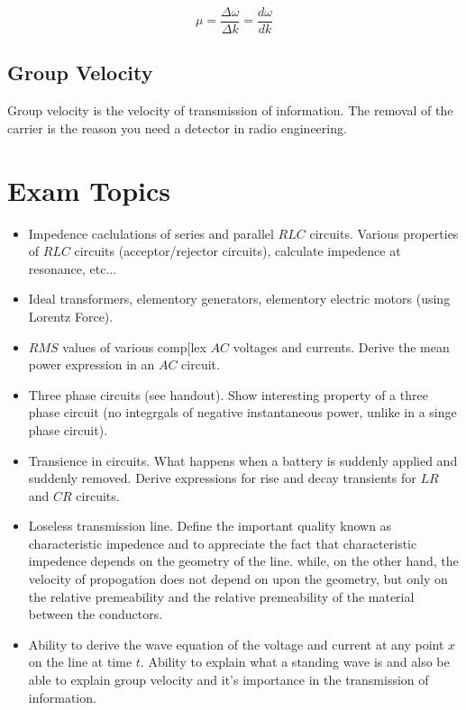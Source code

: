 \documentclass[a4paper,12pt]{article}
\begin{document}
\[ \mu = \frac{\Delta \omega}{\Delta k} = \frac{d \omega}{d k} \]

\subsection{Group Velocity}

Group velocity is the velocity of transmission of information. The 
removal of the carrier is the reason you need a detector in radio
engineering.

\section{Exam Topics}

\begin{itemize}

\item Impedence caclulations of series and parallel $RLC$ circuits.
Various properties of $RLC$ circuits (acceptor/rejector circuits),
calculate impedence at resonance, etc...

\item Ideal transformers, elementory generators, elementory electric
motors (using Lorentz Force).

\item $RMS$ values of various comp[lex $AC$ voltages and currents.
Derive the mean power expression in an $AC$ circuit.

\item Three phase circuits (see handout). Show interesting property of a
three phase circuit (no integrgals of negative instantaneous power,
unlike in a singe phase circuit).

\item Transience in circuits. What happens when a battery is suddenly
applied and suddenly removed. Derive expressions for rise and decay
transients for $LR$ and $CR$ circuits.

\item Loseless transmission line. Define the important quality known as
characteristic impedence and to appreciate the fact that characteristic
impedence depends on the geometry of the line. while, on the other hand,
the velocity of propogation does not depend on upon the geometry, but
only on the relative premeability and the relative premeability of the
material between the conductors.

\item Ability to derive the wave equation of the voltage and current at
any point $x$ on the line at time $t$. Ability to explain what a
standing wave is and also be able to explain group velocity and it's
importance in the transmission of information.

\end{itemize}
\end{document}
